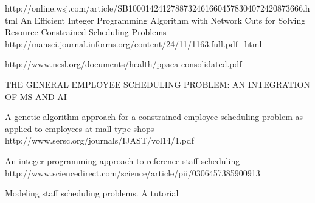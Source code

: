 \begin{thebibliography}{99} %

   http://online.wsj.com/article/SB10001424127887324616604578304072420873666.html
 An Efficient Integer Programming Algorithm with Network Cuts for Solving Resource-Constrained Scheduling Problems http://mansci.journal.informs.org/content/24/11/1163.full.pdf+html


 http://www.ncsl.org/documents/health/ppaca-consolidated.pdf




 THE GENERAL EMPLOYEE SCHEDULING PROBLEM: AN INTEGRATION OF MS AND AI

A genetic algorithm approach for a constrained employee scheduling problem as applied to employees at mall type shops http://www.sersc.org/journals/IJAST/vol14/1.pdf

 An integer programming approach to reference staff scheduling http://www.sciencedirect.com/science/article/pii/0306457385900913

 Modeling staﬀ scheduling problems. A tutorial 

\end{thebibliography}